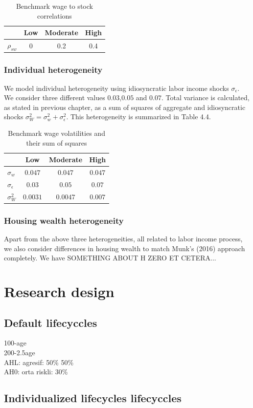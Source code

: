\begin{table}
	\centering
	\begin{tabular}[c]{c|ccc}
		&Low&Moderate&High\\
		\hline
		$\rho_{sw}$&0&0.2&0.4
	\end{tabular}
	\caption{Benchmark wage to stock correlations}
\end{table}


\subsubsection{Individual heterogeneity}

We model individual heterogeneity using idiosyncratic labor income shocks $\sigma_{\epsilon}$. We consider three different values $0.03$,$0.05$ and $0.07$. Total variance is calculated, as stated in previous chapter, as a sum of squares of aggregate and idiosyncratic shocks $\sigma^2_W = \sigma^2_w + \sigma^2_{\epsilon}$. This heterogeneity is summarized in Table 4.4. 


\begin{table}
	\centering
	\begin{tabular}[c]{l|ccc}
		&Low&Moderate&High\\
		\hline
		$\sigma_w$&$0.047$&$0.047$&$0.047$\\
		$\sigma_{\epsilon}$&$0.03$&$0.05$&$0.07$\\
		$\sigma^2_{W}$&$0.0031$&$0.0047$&$0.007$
	\end{tabular}
	\caption{Benchmark wage volatilities and their sum of squares}
\end{table}


\subsubsection{Housing wealth heterogeneity}

Apart from the above three heterogeneities, all related to labor income process, we also consider differences in housing wealth to match Munk's (2016) approach completely. We have SOMETHING ABOUT H ZERO ET CETERA...


\section{Research design}

\subsection{Default lifecyccles}
100-age\\
200-2.5age\\
AHL: agresif: 50\% 50\% \\
AH0: orta riskli: 30\% \\


\subsection{Individualized lifecycles lifecyccles}
